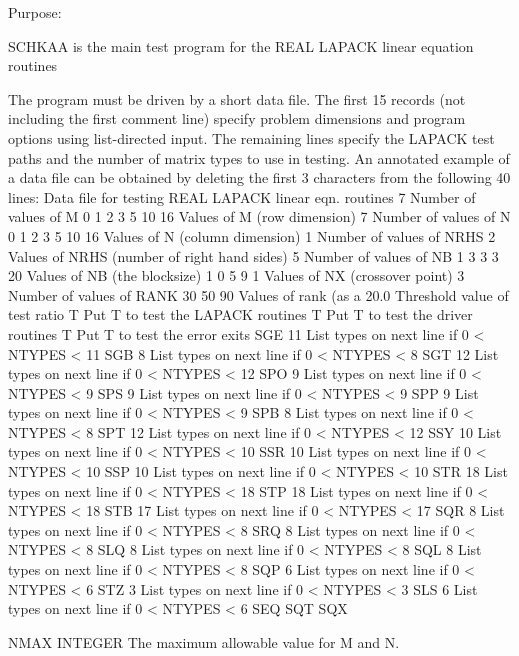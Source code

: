 \begin{DoxyParagraph}{Purpose\+: }
\begin{DoxyVerb} SCHKAA is the main test program for the REAL LAPACK
 linear equation routines

 The program must be driven by a short data file. The first 15 records
 (not including the first comment  line) specify problem dimensions
 and program options using list-directed input. The remaining lines
 specify the LAPACK test paths and the number of matrix types to use
 in testing.  An annotated example of a data file can be obtained by
 deleting the first 3 characters from the following 40 lines:
 Data file for testing REAL LAPACK linear eqn. routines
 7                      Number of values of M
 0 1 2 3 5 10 16        Values of M (row dimension)
 7                      Number of values of N
 0 1 2 3 5 10 16        Values of N (column dimension)
 1                      Number of values of NRHS
 2                      Values of NRHS (number of right hand sides)
 5                      Number of values of NB
 1 3 3 3 20             Values of NB (the blocksize)
 1 0 5 9 1              Values of NX (crossover point)
 3                      Number of values of RANK
 30 50 90               Values of rank (as a %
 20.0                   Threshold value of test ratio
 T                      Put T to test the LAPACK routines
 T                      Put T to test the driver routines
 T                      Put T to test the error exits
 SGE   11               List types on next line if 0 < NTYPES < 11
 SGB    8               List types on next line if 0 < NTYPES <  8
 SGT   12               List types on next line if 0 < NTYPES < 12
 SPO    9               List types on next line if 0 < NTYPES <  9
 SPS    9               List types on next line if 0 < NTYPES <  9
 SPP    9               List types on next line if 0 < NTYPES <  9
 SPB    8               List types on next line if 0 < NTYPES <  8
 SPT   12               List types on next line if 0 < NTYPES < 12
 SSY   10               List types on next line if 0 < NTYPES < 10
 SSR   10               List types on next line if 0 < NTYPES < 10
 SSP   10               List types on next line if 0 < NTYPES < 10
 STR   18               List types on next line if 0 < NTYPES < 18
 STP   18               List types on next line if 0 < NTYPES < 18
 STB   17               List types on next line if 0 < NTYPES < 17
 SQR    8               List types on next line if 0 < NTYPES <  8
 SRQ    8               List types on next line if 0 < NTYPES <  8
 SLQ    8               List types on next line if 0 < NTYPES <  8
 SQL    8               List types on next line if 0 < NTYPES <  8
 SQP    6               List types on next line if 0 < NTYPES <  6
 STZ    3               List types on next line if 0 < NTYPES <  3
 SLS    6               List types on next line if 0 < NTYPES <  6
 SEQ
 SQT
 SQX\end{DoxyVerb}
 \begin{DoxyVerb}  NMAX    INTEGER
          The maximum allowable value for M and N.


\end{DoxyVerb}
\end{DoxyParagraph}
